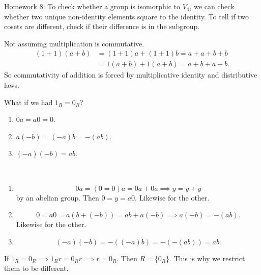 \documentclass[class=article,crop=false]{standalone}
\begin{document}
Homework 8: To check whether a group is isomorphic to $ V_4$, we can check whether two unique non-identity elements square to the identity. To tell if two cosets are different, check if their difference is in the subgroup.

\begin{eg}[]
	Not assuming multiplication is commutative.
	\begin{align*}
		(1+1)(a+b) &= (1+1)a+(1+1)b = a+a+b+b\\ 
			   &=1(a+b)+1(a+b)= a+b+a+b. 
 \end{align*}
 So commutativity of addition is forced by multiplicative identity and distributive laws.
\end{eg}

What if we had $ 1_R=0_R$?

\begin{thm}[18.8]
\begin{enumerate}[label=(\roman*)]
	\item $0a=a0=0$.
	\item $a(-b)=(-a)b=-(ab)$.
	\item $ (-a)(-b)=ab$.
\end{enumerate}
\end{thm}
\begin{prf}
~\begin{enumerate}[label=(\roman*)]
	\item \[
			0a=(0=0)a=0a+0a \implies y=y+y 
	\] 
	by an abelian group. Then $ 0=y=a0$. Likewise for the other.
\item 
	 \[
		 0=a0=a(b+(-b))=ab+a(-b) \implies a(-b) = -(ab)
	.\] 
	Likewise for the other.
\item \[
		(-a)(-b)= -((-a)b)=-(-(ab))=ab
.\] 
\end{enumerate}
\end{prf}

If $ 1_R=0_R \implies 1_R r = 0_R r \implies r=0_R$. Then $ R=\{0_R\} $. This is why we restrict them to be different.
\end{document}
